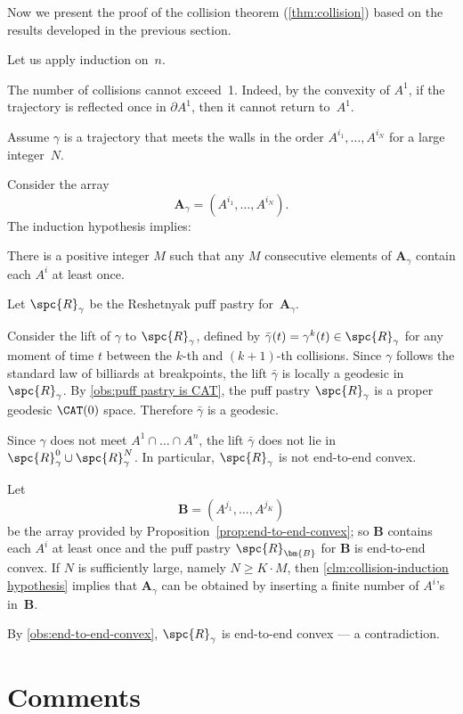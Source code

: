 Now we present the proof of the collision theorem (\ref{thm:collision})
based on the results developed in the previous section.

Let us apply induction on~$n$.

The number of collisions cannot exceed~1.  
Indeed, by the convexity of $A^1$,
if the trajectory is reflected once in $\partial A^1$, 
then it cannot return to~$A^1$. 

Assume $\gamma$ is a trajectory that  meets the walls in the order $A^{i_1},\dots,A^{i_N}$ for a large integer~$N$.

Consider the array 
\[\bm{A}_\gamma=(A^{i_1},\dots,A^{i_N}).\]
The induction hypothesis implies:

\begin{clm}{}\label{clm:collision-induction hypothesis}
There is a positive integer $M$ such that any $M$ consecutive elements of $\bm{A}_\gamma$ contain each $A^i$ at least once.
\end{clm}

Let $\spc{R}_\gamma $ be  the  Reshetnyak puff pastry for~$\bm{A}_\gamma$.

Consider the lift of $\gamma$ to $\spc{R}_\gamma$,
defined by 
$\bar\gamma(t)=\gamma^k(t)\in \spc{R}_\gamma$ 
for any moment of time $t$ between the $k$-th and $(k+1)$-th collisions.  
Since $\gamma$ follows the standard law of billiards at breakpoints, the lift $\bar\gamma$ is locally a geodesic in~$\spc{R}_\gamma$.
By \ref{obs:puff pastry is CAT},
the puff pastry $\spc{R}_\gamma$ is a proper geodesic $\CAT(0)$ space.
Therefore $\bar\gamma$ is a geodesic.

Since $\gamma$ does not meet $A^1\cap\dots\cap A^n$,
the lift $\bar\gamma$ does not lie in  $\spc{R}_\gamma^0\cup \spc{R}_\gamma^N$.
In particular, $\spc{R}_\gamma$ is not end-to-end convex.

Let 
\[\bm{B}=(A^{j_1},\dots,A^{j_K})\] 
be the array provided by Proposition~\ref{prop:end-to-end-convex};
so $\bm{B}$ contains each $A^i$ at least once
and the puff pastry $\spc{R}_{\bm{B}}$ for $\bm{B}$ is end-to-end convex.
If $N$ is sufficiently large, namely $N\ge K\cdot M$, then
 \ref{clm:collision-induction hypothesis}
implies that $\bm{A}_\gamma$ can be obtained  
by inserting a finite number of $A^i$'s in~$\bm{B}$.

By \ref{obs:end-to-end-convex}, 
$\spc{R}_\gamma$ is end-to-end convex --- a contradiction.
\qeds

\section{Comments}


